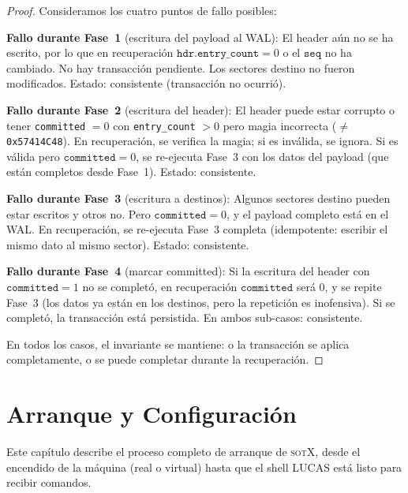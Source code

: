 \documentclass[11pt,twoside,openright]{book}
\theoremstyle{definition}
\theoremstyle{plain}
\theoremstyle{remark}
\newcommand{\sotos}{\textsc{sotX}}
\begin{document}
\begin{proof}
Consideramos los cuatro puntos de fallo posibles:

\textbf{Fallo durante Fase~1} (escritura del payload al WAL): El header aún no
se ha escrito, por lo que en recuperación $\texttt{hdr.entry\_count} = 0$ o el
$\texttt{seq}$ no ha cambiado. No hay transacción pendiente. Los sectores
destino no fueron modificados. Estado: consistente (transacción no ocurrió).

\textbf{Fallo durante Fase~2} (escritura del header): El header puede estar
corrupto o tener \texttt{committed} $= 0$ con \texttt{entry\_count} $> 0$
pero magia incorrecta ($\neq$ \texttt{0x57414C48}). En recuperación, se
verifica la magia; si es inválida, se ignora. Si es válida pero
$\texttt{committed} = 0$, se re-ejecuta Fase~3 con los datos del payload
(que están completos desde Fase~1). Estado: consistente.

\textbf{Fallo durante Fase~3} (escritura a destinos): Algunos sectores
destino pueden estar escritos y otros no. Pero $\texttt{committed} = 0$,
y el payload completo está en el WAL. En recuperación, se re-ejecuta Fase~3
completa (idempotente: escribir el mismo dato al mismo sector). Estado: consistente.

\textbf{Fallo durante Fase~4} (marcar committed): Si la escritura del header
con $\texttt{committed} = 1$ no se completó, en recuperación
$\texttt{committed}$ será 0, y se repite Fase~3 (los datos ya están en los
destinos, pero la repetición es inofensiva). Si se completó, la transacción
está persistida. En ambos sub-casos: consistente.

En todos los casos, el invariante se mantiene: o la transacción se aplica
completamente, o se puede completar durante la recuperación. \qedhere
\end{proof}

\chapter{Arranque y Configuración}
\label{chap:arranque}

Este capítulo describe el proceso completo de arranque de \sotos{}, desde el
encendido de la máquina (real o virtual) hasta que el shell LUCAS está listo
para recibir comandos.

\end{document}
